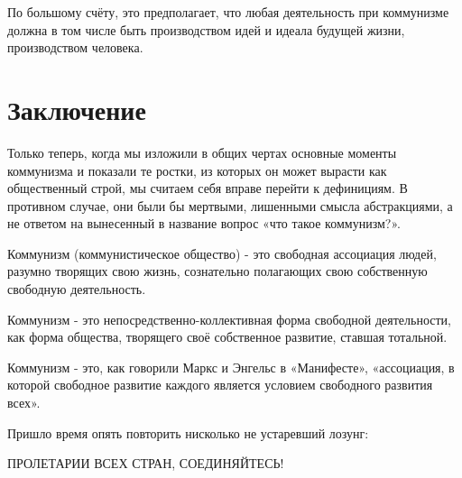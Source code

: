 \documentclass[12pt,a4paper,openany]{book}
\begin{document}
По большому счёту, это предполагает, что любая деятельность при коммунизме должна в том числе быть производством идей и идеала будущей жизни, производством человека.
\ifSubfilesClassLoaded{\setcounter{page}{62}}{}
\section{Заключение}
\label{sec:11_zaklyuchenie}

Только теперь, когда мы изложили в общих чертах основные моменты коммунизма и показали те ростки, из которых он может вырасти как общественный строй, мы считаем себя вправе перейти к дефинициям. В противном случае, они были бы мертвыми, лишенными смысла абстракциями, а не ответом на вынесенный в название вопрос «что такое коммунизм?».

Коммунизм (коммунистическое общество) - это свободная ассоциация людей, разумно творящих свою жизнь, сознательно полагающих свою собственную свободную деятельность.

Коммунизм - это непосредственно-коллективная форма свободной деятельности, как форма общества, творящего своё собственное развитие, ставшая тотальной.

Коммунизм - это, как говорили Маркс и Энгельс в «Манифесте», «ассоциация, в которой свободное развитие каждого является условием свободного развития всех».

Пришло время опять повторить нисколько не устаревший лозунг:

ПРОЛЕТАРИИ ВСЕХ СТРАН, СОЕДИНЯЙТЕСЬ!
\end{document}
